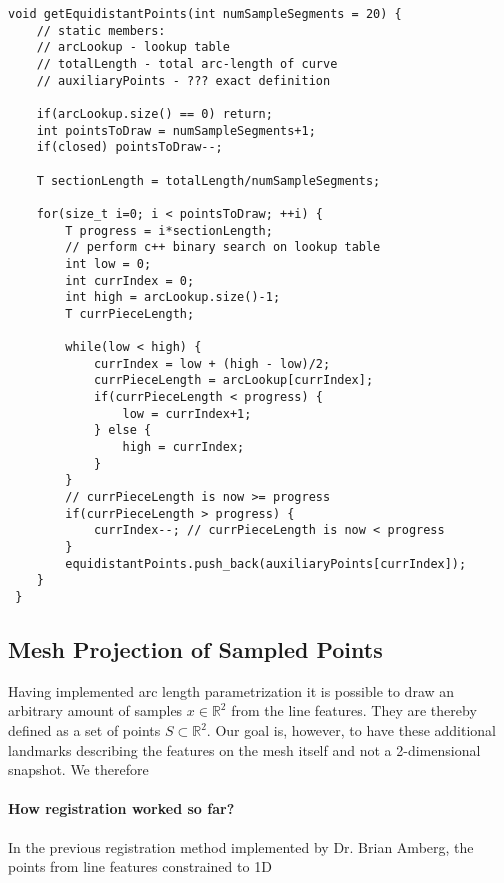 \begin{lstlisting}[label=some-code, caption=Equidistant Sampling]
void getEquidistantPoints(int numSampleSegments = 20) {
    // static members: 
    // arcLookup - lookup table
    // totalLength - total arc-length of curve
    // auxiliaryPoints - ??? exact definition 

    if(arcLookup.size() == 0) return;
    int pointsToDraw = numSampleSegments+1; 
    if(closed) pointsToDraw--;

    T sectionLength = totalLength/numSampleSegments;

    for(size_t i=0; i < pointsToDraw; ++i) {
        T progress = i*sectionLength;
        // perform c++ binary search on lookup table
        int low = 0;
        int currIndex = 0;
        int high = arcLookup.size()-1;
        T currPieceLength; 

        while(low < high) {
            currIndex = low + (high - low)/2; 
            currPieceLength = arcLookup[currIndex];
            if(currPieceLength < progress) {
                low = currIndex+1;
            } else {
                high = currIndex;
            }
        }
        // currPieceLength is now >= progress
        if(currPieceLength > progress) {
            currIndex--; // currPieceLength is now < progress
        }
        equidistantPoints.push_back(auxiliaryPoints[currIndex]);   
    }
 }
\end{lstlisting}

\subsection{Mesh Projection of Sampled Points}
Having implemented arc length parametrization it is possible to draw an arbitrary amount of samples $x \in \mathbb{R}^2$ from the line features. They are thereby defined as a set of points $S \subset \mathbb{R}^2$. Our goal is, however, to have these additional landmarks describing the features on the mesh itself and not a 2-dimensional snapshot.
We therefore 

\paragraph{How registration worked so far?}
In the previous registration method implemented by Dr. Brian Amberg, the
points from line features constrained to 1D

